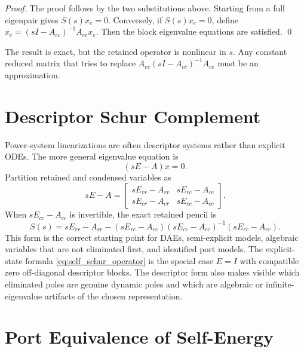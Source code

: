 \begin{proof}
The proof follows by the two substitutions above. Starting from a full
eigenpair gives \(S(s)x_e=0\). Conversely, if \(S(s)x_e=0\), define
\(x_c=(sI-A_{cc})^{-1}A_{ce}x_e\). Then the block eigenvalue equations are
satisfied. \qed
\end{proof}

The result is exact, but the retained operator is nonlinear in \(s\). Any
constant reduced matrix that tries to replace \(A_{ec}(sI-A_{cc})^{-1}A_{ce}\)
must be an approximation.

\section{Descriptor Schur Complement}

Power-system linearizations are often descriptor systems rather than explicit
ODEs. The more general eigenvalue equation is
\begin{equation}
  (sE-A)x=0.
  \label{eq:self_descriptor_pencil}
\end{equation}
Partition retained and condensed variables as
\begin{equation}
  sE-A
  =
  \begin{bmatrix}
    sE_{rr}-A_{rr} & sE_{rc}-A_{rc}\\
    sE_{cr}-A_{cr} & sE_{cc}-A_{cc}
  \end{bmatrix}.
  \label{eq:self_descriptor_partition}
\end{equation}
When \(sE_{cc}-A_{cc}\) is invertible, the exact retained pencil is
\begin{equation}
  S(s)
  =
  sE_{rr}-A_{rr}
  -
  (sE_{rc}-A_{rc})
  (sE_{cc}-A_{cc})^{-1}
  (sE_{cr}-A_{cr}).
  \label{eq:self_descriptor_schur}
\end{equation}
This form is the correct starting point for DAEs, semi-explicit models,
algebraic variables that are not eliminated first, and identified port models.
The explicit-state formula \eqref{eq:self_schur_operator} is the special case
\(E=I\) with compatible zero off-diagonal descriptor blocks. The descriptor
form also makes visible which eliminated poles are genuine dynamic poles and
which are algebraic or infinite-eigenvalue artifacts of the chosen
representation.

\section{Port Equivalence of Self-Energy}

